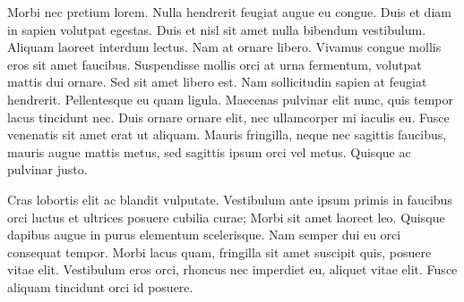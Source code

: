 \documentclass[11pt]{article}
\begin{document}
Morbi nec pretium lorem. Nulla hendrerit feugiat augue eu congue. Duis et diam in sapien volutpat egestas. Duis et nisl sit amet nulla bibendum vestibulum. Aliquam laoreet interdum lectus. Nam at ornare libero. Vivamus congue mollis eros sit amet faucibus. Suspendisse mollis orci at urna fermentum, volutpat mattis dui ornare. Sed sit amet libero est. Nam sollicitudin sapien at feugiat hendrerit. Pellentesque eu quam ligula. Maecenas pulvinar elit nunc, quis tempor lacus tincidunt nec. Duis ornare ornare elit, nec ullamcorper mi iaculis eu. Fusce venenatis sit amet erat ut aliquam. Mauris fringilla, neque nec sagittis faucibus, mauris augue mattis metus, sed sagittis ipsum orci vel metus. Quisque ac pulvinar justo.

Cras lobortis elit ac blandit vulputate. Vestibulum ante ipsum primis in faucibus orci luctus et ultrices posuere cubilia curae; Morbi sit amet laoreet leo. Quisque dapibus augue in purus elementum scelerisque. Nam semper dui eu orci consequat tempor. Morbi lacus quam, fringilla sit amet suscipit quis, posuere vitae elit. Vestibulum eros orci, rhoncus nec imperdiet eu, aliquet vitae elit. Fusce aliquam tincidunt orci id posuere. 
\end{document}

